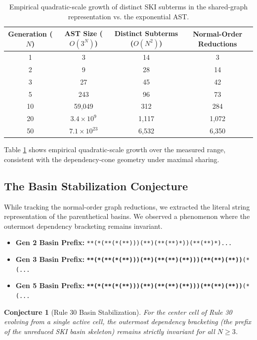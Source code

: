 \documentclass[11pt]{article}
\newtheorem{conjecture}{Conjecture}
\begin{document}
\begin{table}[h]
\centering
\begin{tabular}{|c|c|c|c|}
\hline
\textbf{Generation ($N$)} & \textbf{AST Size ($O(3^N)$)} & \textbf{Distinct Subterms ($O(N^2)$)} & \textbf{Normal-Order Reductions} \\
\hline
1 & 3 & 14 & 3 \\
2 & 9 & 28 & 14 \\
3 & 27 & 45 & 42 \\
5 & 243 & 96 & 73 \\
10 & 59,049 & 312 & 284 \\
20 & $3.4 \times 10^9$ & 1,117 & 1,072 \\
50 & $7.1 \times 10^{23}$ & 6,532 & 6,350 \\
\hline
\end{tabular}
\caption{Empirical quadratic-scale growth of distinct SKI subterms in the shared-graph representation vs. the exponential AST.}
\label{tab:growth}
\end{table}

Table \ref{tab:growth} shows empirical quadratic-scale growth over the measured range, consistent with the dependency-cone geometry under maximal sharing. 

\subsection{The Basin Stabilization Conjecture}
While tracking the normal-order graph reductions, we extracted the literal string representation of the parenthetical basins. We observed a phenomenon where the outermost dependency bracketing remains invariant.

\begin{itemize}
    \item \textbf{Gen 2 Basin Prefix:} \texttt{**(*(**(*(**)))(**)(**(**)*))(**(**)*)...}
    \item \textbf{Gen 3 Basin Prefix:} \texttt{\textbf{**(*(**(*(**)))(**)(**(**)(**)))(**(**)(**))}(*(...}
    \item \textbf{Gen 5 Basin Prefix:} \texttt{\textbf{**(*(**(*(**)))(**)(**(**)(**)))(**(**)(**))}(*(...}
\end{itemize}

\begin{conjecture}[Rule 30 Basin Stabilization]
For the center cell of Rule 30 evolving from a single active cell, the outermost dependency bracketing (the prefix of the unreduced SKI basin skeleton) remains strictly invariant for all $N \ge 3$. 
\end{conjecture}
\end{document}
